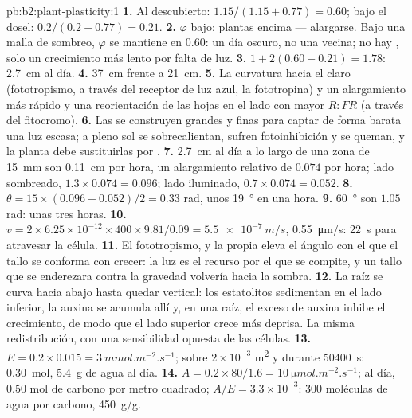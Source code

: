 \begin{solution}{pb:b2:plant-plasticity:1}
\textbf{1.} Al descubierto: $1.15/(1.15 + 0.77) = 0.60$; bajo el dosel:
$0.2/(0.2 +
0.77) = 0.21$.
\textbf{2.} $\varphi$ bajo: plantas encima --- alargarse. Bajo una malla de
sombreo, $\varphi$ se mantiene en $0.60$: un día oscuro, no una vecina; no
hay , solo un crecimiento más lento por falta de
luz.
\textbf{3.} $1 + 2(0.60 - 0.21) = 1.78$: \qty{2.7}{cm} al día.
\textbf{4.} \qty{37}{cm} frente a \qty{21}{cm}.
\textbf{5.} La curvatura hacia el claro (fototropismo, a través del
receptor de luz azul, la fototropina) y un alargamiento más rápido y una
reorientación de las hojas en el lado con mayor $R{:}FR$ (a través del
fitocromo).
\textbf{6.} Las  se construyen grandes y finas para captar
de forma barata una luz escasa; a pleno sol se sobrecalientan, sufren
fotoinhibición y se queman, y la planta debe sustituirlas por .
\textbf{7.} \qty{2.7}{cm} al día a lo largo de una zona de \qty{15}{mm} son
\qty{0.11}{cm} por hora, un alargamiento relativo de $0.074$ por hora;
lado sombreado, $1.3\times 0.074 = 0.096$; lado iluminado, $0.7\times 0.074 =
0.052$.
\textbf{8.} $\theta = 15\times(0.096 - 0.052)/2 = 0.33$ rad, unos
\qty{19}{\degree} en una hora.
\textbf{9.} \qty{60}{\degree} son $1.05$ rad: unas tres horas.
\textbf{10.} $v = 2\times 6.25\times 10^{-12}\times 400\times
9.81/0.09 = \qty{5.5e-7}{m/s}$, \qty{0.55}{\micro m/s}: \qty{22}{s}
para atravesar la célula.
\textbf{11.} El fototropismo, y la propia  eleva el
ángulo con el que el tallo se conforma con crecer: la luz es el recurso
por el que se compite, y un tallo que se enderezara contra la gravedad
volvería hacia la sombra.
\textbf{12.} La raíz se curva hacia abajo hasta quedar vertical: los
estatolitos sedimentan en el lado inferior, la auxina se acumula allí y,
en una raíz, el exceso de auxina inhibe el crecimiento, de modo que el
lado superior crece más deprisa. La misma redistribución, con una
sensibilidad opuesta de las células.
\textbf{13.} $E = 0.2\times 0.015 = \qty{3}{mmol.m^{-2}.s^{-1}}$; sobre
$2\times 10^{-3}$ \unit{m^2} y durante \qty{50400}{s}: \qty{0.30}{mol},
\qty{5.4}{g} de agua al día.
\textbf{14.} $A = 0.2\times 80/1.6 = \qty{10}{\micro mol.m^{-2}.s^{-1}}$;
al día, $0.50$ mol de carbono por metro cuadrado; $A/E = 3.3\times
10^{-3}$: 300 moléculas de agua por carbono, \qty{450}{g/g}.

\end{solution}

